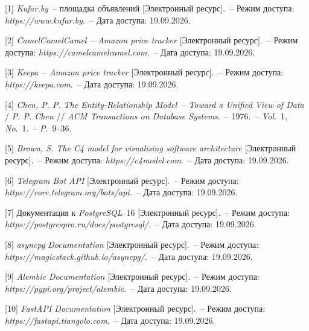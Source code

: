 \renewcommand{\bibsection}{\sectioncentered*{Список использованных источников}}
\pagebreak %


[1] \textit{Kufar.by}~-- площадка объявлений [Электронный ресурс].~-- Режим доступа: \textit{https://www.\allowbreak kufar.\allowbreak by}.~-- Дата доступа: 19.09.2026.

[2] \textit{CamelCamelCamel}~-- \textit{Amazon price tracker} [Электронный ресурс].~-- Режим доступа: \textit{https://camelcamelcamel.\allowbreak com}.~-- Дата доступа: 19.09.2026.

[3] \textit{Keepa}~-- \textit{Amazon price tracker} [Электронный ресурс].~-- Режим доступа: \textit{https://keepa.\allowbreak com}.~-- Дата доступа: 19.09.2026.

[4] \textit{Chen, P. P.} \textit{The Entity-Relationship Model~-- Toward a Unified View of Data} / \textit{P. P. Chen} // \textit{ACM Transactions on Database Systems}.~-- 1976.~-- \textit{Vol}.~1, \textit{No}.~1.~-- \textit{P}.~9--36.

[5] \textit{Brown, S. The C4 model for visualising software architecture} [Электронный ресурс].~-- Режим доступа: \textit{https://c4model.\allowbreak com}.~-- Дата доступа: 19.09.2026.

[6] \textit{Telegram Bot API} [Электронный ресурс].~-- Режим доступа: \textit{https://core.\allowbreak telegram.\allowbreak org/\allowbreak bots/\allowbreak api}.~-- Дата доступа: 19.09.2026.

[7] Документация к \textit{PostgreSQL}~16 [Электронный ресурс].~-- Режим доступа: \textit{https://postgrespro.\allowbreak ru/\allowbreak docs/\allowbreak postgresql/}.~-- Дата доступа: 19.09.2026.

[8] \textit{asyncpg Documentation} [Электронный ресурс].~-- Режим доступа: \textit{https://magicstack.\allowbreak github.\allowbreak io/\allowbreak asyncpg/}.~-- Дата доступа: 19.09.2026.

[9] \textit{Alembic Documentation} [Электронный ресурс].~-- Режим доступа: \textit{https://pypi.\allowbreak org/\allowbreak project/\allowbreak alembic}.~-- Дата доступа: 19.09.2026.

[10] \textit{FastAPI Documentation} [Электронный ресурс].~-- Режим доступа: \textit{https://fastapi.\allowbreak tiangolo.\allowbreak com}.~-- Дата доступа: 19.09.2026.

